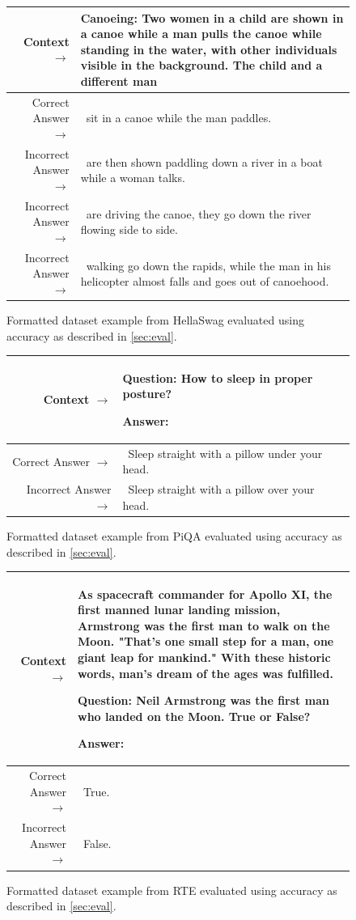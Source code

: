 \documentclass{article}
\begin{document}
\begin{figure}[!h] { \tt \footnotesize \begin{tabularx}{\linewidth}{r X} \toprule Context $\to$ & Canoeing: Two women in a child are shown in a canoe while a man pulls the canoe while standing in the water, with other individuals visible in the background. The child and a different man\\
\midrule 
Correct Answer $\to$ & ~sit in a canoe while the man paddles. \\ 
Incorrect Answer $\to$ & ~are then shown paddling down a river in a boat while a woman talks. \\
Incorrect Answer $\to$ & ~are driving the canoe, they go down the river flowing side to side. \\
Incorrect Answer $\to$ & ~walking go down the rapids, while the man in his helicopter almost falls and goes out of canoehood. \\
\bottomrule \end{tabularx} }
\caption{Formatted dataset example from HellaSwag evaluated using accuracy as described in \autoref{sec:eval}.}  
\label{eval:hellaswag}  
\end{figure}

\begin{figure}[!h] { \tt \footnotesize \begin{tabularx}{\linewidth}{r X} \toprule Context $\to$ & Question: How to sleep in proper posture?

Answer:\\
\midrule 
Correct Answer $\to$ & ~Sleep straight with a pillow under your head. \\ 
Incorrect Answer $\to$ & ~Sleep straight with a pillow over your head. \\
\bottomrule \end{tabularx} }
\caption{Formatted dataset example from PiQA evaluated using accuracy as described in \autoref{sec:eval}.}  
\label{eval:piqa}  
\end{figure}

\begin{figure}[!h] { \tt \footnotesize \begin{tabularx}{\linewidth}{r X} \toprule Context $\to$ & As spacecraft commander for Apollo XI, the first manned lunar landing mission, Armstrong was the first man to walk on the Moon. "That's one small step for a man, one giant leap for mankind." With these historic words, man's dream of the ages was fulfilled. 

Question: Neil Armstrong was the first man who landed on the Moon. True or False?

Answer:\\
\midrule 
Correct Answer $\to$ & ~True. \\ 
Incorrect Answer $\to$ & ~False. \\
\bottomrule \end{tabularx} }
\caption{Formatted dataset example from RTE evaluated using accuracy as described in \autoref{sec:eval}.}  
\label{eval:rte}  
\end{figure}
\end{document}
